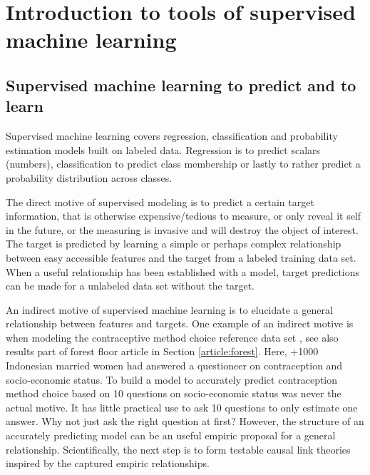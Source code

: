 \chapter{Introduction to tools of supervised machine learning}
\label{chap_introStat}

\section{Supervised machine learning to predict and to learn}
Supervised machine learning covers regression, classification and probability estimation models built on labeled data. Regression is to predict scalars (numbers), classification to predict class membership or lastly to rather predict a probability distribution across classes. 

The direct motive of supervised modeling is to predict a certain target information, that is otherwise expensive/tedious to measure, or only reveal it self in the future, or the measuring is invasive and will destroy the object of interest. The target is predicted by learning a simple or perhaps complex relationship between easy accessible features and the target from a labeled training data set. When a useful relationship has been established with a model, target predictions can be made for a unlabeled data set without the target.

An indirect motive of supervised machine learning is to elucidate a general relationship between features and targets. One example of an indirect motive is when modeling the contraceptive method choice reference data set \cite{lichman2013uci}, see also results part of forest floor article in Section \ref{article:forest}. Here, +1000 Indonesian married women had answered a questioneer on contraception and socio-economic status. To build a model to accurately predict contraception method choice based on 10 questions on socio-economic status was never the actual motive. It has little practical use to ask 10 questions to only estimate one answer. Why not just ask the right question at first? However, the structure of an accurately predicting model can be an useful empiric proposal for a general relationship. Scientifically, the next step is to form testable causal link theories inspired by the captured empiric relationships. 

